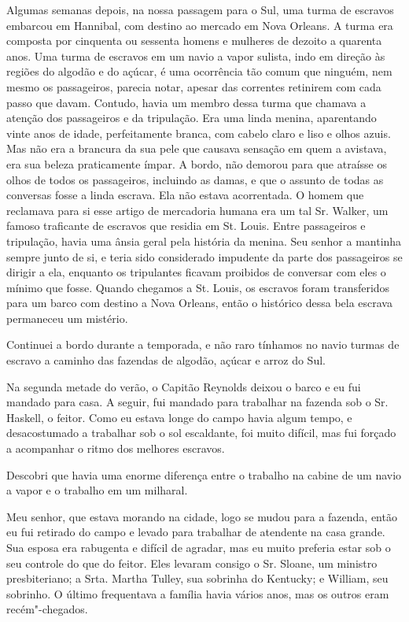 Algumas semanas depois, na nossa passagem para o Sul, uma turma de
escravos embarcou em Hannibal, com destino ao mercado em Nova Orleans. A
turma era composta por cinquenta ou sessenta homens e mulheres de dezoito a 
quarenta anos. Uma turma de escravos em um navio a vapor sulista, indo
em direção às regiões do algodão e do açúcar, é uma ocorrência tão comum
que ninguém, nem mesmo os passageiros, parecia notar, apesar das
correntes retinirem com cada passo que davam. Contudo, havia um membro
dessa turma que chamava a atenção dos passageiros e da tripulação. Era
uma linda menina, aparentando vinte anos de idade, perfeitamente branca,
com cabelo claro e liso e olhos azuis. Mas não era a brancura da sua
pele que causava sensação em quem a avistava, era sua beleza
praticamente ímpar. A bordo, não demorou para que atraísse os olhos de
todos os passageiros, incluindo as damas, e que o assunto de todas as
conversas fosse a linda escrava. Ela não estava acorrentada. O homem que
reclamava para si esse artigo de mercadoria humana era um tal Sr.
Walker, um famoso traficante de escravos que residia em St. Louis. Entre
passageiros e tripulação, havia uma ânsia geral pela história da menina.
Seu senhor a mantinha sempre junto de si, e teria sido considerado
impudente da parte dos passageiros se dirigir a ela, enquanto os
tripulantes ficavam proibidos de conversar com eles o mínimo que fosse.
Quando chegamos a St. Louis, os escravos foram transferidos para um
barco com destino a Nova Orleans, então o histórico dessa bela escrava
permaneceu um mistério.

Continuei a bordo durante a temporada, e não raro tínhamos no navio
turmas de escravo a caminho das fazendas de algodão, açúcar e arroz do
Sul.

Na segunda metade do verão, o Capitão Reynolds deixou o barco e eu fui
mandado para casa. A seguir, fui mandado para trabalhar na fazenda sob o
Sr. Haskell, o feitor. Como eu estava longe do campo havia algum tempo,
e desacostumado a trabalhar sob o sol escaldante, foi muito difícil, mas
fui forçado a acompanhar o ritmo dos melhores escravos.

Descobri que havia uma enorme diferença entre o trabalho na cabine de um
navio a vapor e o trabalho em um milharal.

Meu senhor, que estava morando na cidade, logo se mudou para a fazenda,
então eu fui retirado do campo e levado para trabalhar de atendente na
casa grande. Sua esposa era rabugenta e difícil de agradar, mas eu muito
preferia estar sob o seu controle do que do feitor. Eles levaram consigo
o Sr. Sloane, um ministro presbiteriano; a Srta. Martha Tulley, sua
sobrinha do Kentucky; e William, seu sobrinho. O último frequentava a
família havia vários anos, mas os outros eram recém"-chegados.

